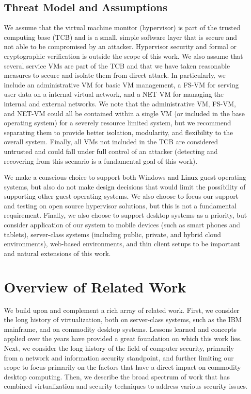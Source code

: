 \subsection{Threat Model and Assumptions}

We assume that the virtual machine monitor (hypervisor) is part of the trusted computing base (TCB) and is a small, simple software layer that is secure and not able to be compromised by an attacker. Hypervisor security and formal or cryptographic verification is outside the scope of this work. We also assume that several service VMs are part of the TCB and that we have taken reasonable measures to secure and isolate them from direct attack. In particularly, we include an administrative VM for basic VM management, a FS-VM for serving user data on a internal virtual network, and a NET-VM for managing the internal and external networks. We note that the administrative VM, FS-VM, and NET-VM could all be contained within a single VM (or included in the base operating system) for a severely resource limited system, but we recommend separating them to provide better isolation, modularity, and flexibility to the overall system. Finally, all VMs not included in the TCB are considered untrusted and could fall under full control of an attacker (detecting and recovering from this scenario is a fundamental goal of this work).

We make a conscious choice to support both Windows and Linux guest operating systems, but also do not make design decisions that would limit the possibility of supporting other guest operating systems.  We also choose to focus our support and testing on open source hypervisor solutions, but this is not a fundamental requirement. Finally, we also choose to support desktop systems as a priority, but consider application of our system to mobile devices (such as smart phones and tablets), server-class systems (including public, private, and hybrid cloud environments), web-based environments, and thin client setups to be important and natural extensions of this work.




\section{Overview of Related Work}

We build upon and complement a rich array of related work. First, we consider the long history of virtualization, both on server-class systems, such as the IBM mainframe, and on commodity desktop systems. Lessons learned and concepts applied over the years have provided a great foundation on which this work lies. Next, we consider the long history of the field of computer security, primarily from a network and information security standpoint, and further limiting our scope to focus primarily on the factors that have a direct impact on commodity desktop computing. Then, we describe the broad spectrum of work that has combined virtualization and security techniques to address various security issues.

